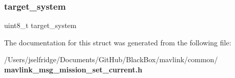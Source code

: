 \mbox{\label{struct____mavlink__mission__set__current__t_ac9afff43526a157e4c4e45607c1418b8}} 
\subsubsection{target\+\_\+system}
{\footnotesize\ttfamily uint8\+\_\+t target\+\_\+system}



The documentation for this struct was generated from the following file\+:\begin{DoxyCompactItemize}
\item 
/\+Users/jselfridge/\+Documents/\+Git\+Hub/\+Black\+Box/mavlink/common/\textbf{ mavlink\+\_\+msg\+\_\+mission\+\_\+set\+\_\+current.\+h}\end{DoxyCompactItemize}
